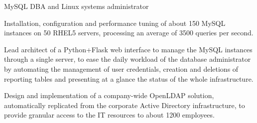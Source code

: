 \documentclass{resume}
\begin{document}
MySQL DBA and Linux systems administrator

Installation, configuration and performance tuning of about 150 MySQL instances on 50 RHEL5 servers, processing an average of 3500 queries per second.

Lead architect of a Python+Flask web interface to manage the MySQL instances through a single server, to ease the daily workload of the database administrator by automating the management of user credentials, creation and deletions of reporting tables and presenting at a glance the status of the whole infrastructure.

Design and implementation of a company-wide OpenLDAP solution, automatically replicated from the corporate Active Directory infrastructure, to provide granular access to the IT resources to about 1200 employees.
\end{document}
